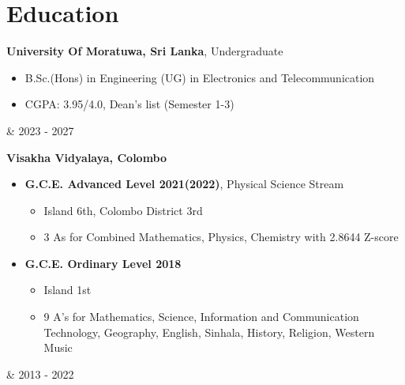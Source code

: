 \documentclass[10pt, a4paper]{article}
\newenvironment{highlights}{
        \begin{itemize}[
                topsep=0pt,
                parsep=0.10 cm,
                partopsep=0pt,
                itemsep=0pt,
                after=\vspace{-1\baselineskip},
                leftmargin=0.4 cm + 3pt
            ]
    }{
        \end{itemize}
    } %
\let\hrefWithoutArrow\href
\renewcommand{\href}[2]{\hrefWithoutArrow{#1}{\mbox{\ifthenelse{\equal{#2}{}}{ }{#2 }\raisebox{.15ex}{\footnotesize \faExternalLink*}}}}
\let\originalTabularx\tabularx
\let\originalEndTabularx\endtabularx
\renewenvironment{tabularx}{\bgroup\centering\originalTabularx}{\originalEndTabularx\par\egroup}
\begin{document}
    \section{Education}

	 \begin{tabularx}{
	            \textwidth-0.4 cm-0.13cm
	        }{
	            K{0.2 cm}
	            R{4.1 cm}
	        }
	            \textbf{University Of Moratuwa, Sri Lanka}, Undergraduate
	
	            \vspace{0.10 cm}
	
	            \begin{highlights}
	                \item B.Sc.(Hons) in Engineering (UG) in Electronics and Telecommunication
                \item CGPA: 3.95/4.0, Dean's list (Semester 1-3)%
	            \end{highlights}
            &
            2023 - 2027
        \end{tabularx}
        
        \vspace{0.2 cm}
        \begin{tabularx}{
	            \textwidth-0.4 cm-0.13cm
	        }{
	            K{0.2 cm}
	            R{4.1 cm}
	        }
	            \textbf{Visakha Vidyalaya, Colombo}
	
	            \vspace{0.10 cm}
	
	            \begin{highlights}
	                \item \textbf{G.C.E. Advanced Level 2021(2022)}, Physical Science Stream 
	            	\begin{highlights}
	            	\item Island 6th, Colombo District 3rd 
	            	\item 3 As for Combined Mathematics, Physics, Chemistry with 2.8644 Z-score
	                \end{highlights} \vspace{0.40 cm}
	                \item \textbf{G.C.E. Ordinary Level 2018}
	                \begin{highlights}
	                \item Island 1st 
	                \item 9 A’s for Mathematics, Science, Information and Communication Technology, Geography, English, Sinhala, History, Religion, Western Music
	                \end{highlights}
	            \end{highlights}
            &
            2013 - 2022
        \end{tabularx}
\end{document}
